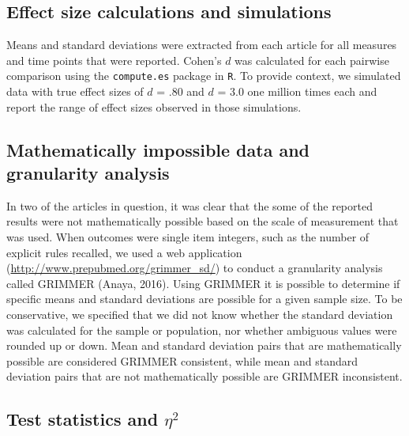 \documentclass[
  english,
  man,floatsintext]{apa7}
\begin{document}
\hypertarget{effect-size-calculations-and-simulations}{%
\subsection{Effect size calculations and simulations}\label{effect-size-calculations-and-simulations}}

Means and standard deviations were extracted from each article for all measures and time points that were reported. Cohen's \(d\) was calculated for each pairwise comparison using the \texttt{compute.es} package in \texttt{R}. To provide context, we simulated data with true effect sizes of \(d\) = .80 and \(d\) = 3.0 one million times each and report the range of effect sizes observed in those simulations.

\hypertarget{mathematically-impossible-data-and-granularity-analysis}{%
\subsection{Mathematically impossible data and granularity analysis}\label{mathematically-impossible-data-and-granularity-analysis}}

In two of the articles in question, it was clear that the some of the reported results were not mathematically possible based on the scale of measurement that was used. When outcomes were single item integers, such as the number of explicit rules recalled, we used a web application (\url{http://www.prepubmed.org/grimmer_sd/}) to conduct a granularity analysis called GRIMMER (Anaya, 2016). Using GRIMMER it is possible to determine if specific means and standard deviations are possible for a given sample size. To be conservative, we specified that we did not know whether the standard deviation was calculated for the sample or population, nor whether ambiguous values were rounded up or down. Mean and standard deviation pairs that are mathematically possible are considered GRIMMER consistent, while mean and standard deviation pairs that are not mathematically possible are GRIMMER inconsistent.

\hypertarget{test-statistics-and-eta2}{%
\subsection{\texorpdfstring{Test statistics and \(\eta^{2}\)}{Test statistics and \textbackslash eta\^{}\{2\}}}\label{test-statistics-and-eta2}}
\end{document}
